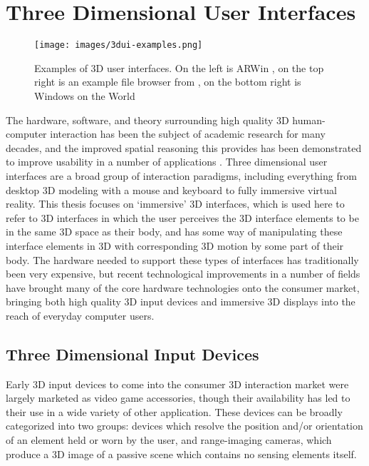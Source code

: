 \section{Three Dimensional User Interfaces}

\begin{figure}[ht!]
\centering
\texttt{[image: images/3dui-examples.png]}
\caption{Examples of 3D user interfaces. On the left is ARWin \protect\cite{arwin}, on the top right is an example file browser from \protect\cite{info-vis}, on the bottom right is Windows on the World \protect\cite{wotw}}
\label{fig:3dui-example}
\end{figure}

The hardware, software, and theory surrounding high quality 3D human-computer interaction has been the subject of academic research for many decades, and the improved spatial reasoning this provides has been demonstrated to improve usability in a  number of applications  \cite{bowman_theory_practice}. Three dimensional user interfaces are a broad group of interaction paradigms, including everything from desktop 3D modeling with a mouse and keyboard to fully immersive virtual reality.  This thesis focuses on ‘immersive' 3D interfaces, which is used here to refer to 3D interfaces in which the user perceives the 3D interface elements to be in the same 3D space as their body, and has some way of manipulating these interface elements in 3D with corresponding 3D motion by some part of their body.  The hardware needed to support these types of interfaces has traditionally been very expensive, but recent technological improvements in a number of fields have brought many of the core hardware technologies onto the consumer market, bringing both high quality 3D input devices and immersive 3D displays into the reach of everyday computer users.

\subsection{Three Dimensional Input Devices}

Early 3D input devices to come into the consumer 3D interaction market were largely marketed as video game accessories, though their availability has led to their use in a wide variety of other application. These devices can be broadly categorized into two groups: devices which resolve the position and/or orientation of an element held or worn by the user, and range-imaging cameras, which produce a 3D image of a passive scene which contains no sensing elements itself.

